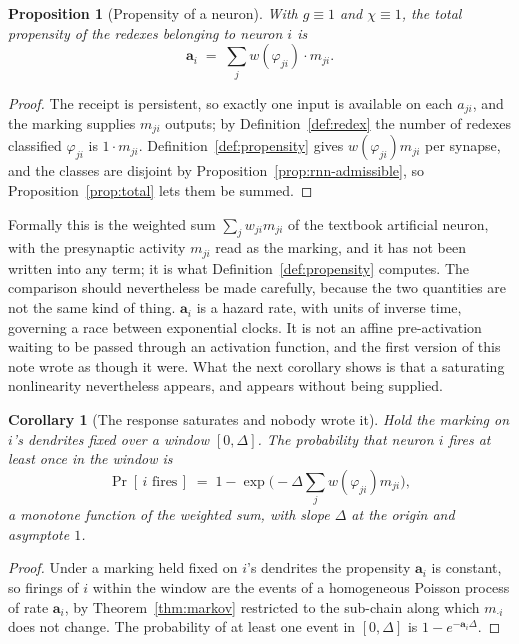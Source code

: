 \documentclass[11pt,a4paper]{article}
\theoremstyle{plain}
\newtheorem{proposition}[theorem]{Proposition}
\newtheorem{corollary}[theorem]{Corollary}
\theoremstyle{definition}
\theoremstyle{remark}
\newcommand{\prop}{\mathbf{a}}
\newcommand{\wmap}{w}
\newcommand{\gfac}{g}
\begin{document}
\begin{proposition}[Propensity of a neuron]
\label{prop:neuron-prop}
With $\gfac \equiv 1$ and $\chi \equiv 1$, the total propensity of the redexes belonging to neuron
$i$ is
\[
\prop_i \;=\; \sum_{j} \wmap(\varphi_{ji}) \cdot m_{ji} .
\]
\end{proposition}

\begin{proof}
The receipt is persistent, so exactly one input is available on each $a_{ji}$, and the marking
supplies $m_{ji}$ outputs; by Definition~\ref{def:redex} the number of redexes classified
$\varphi_{ji}$ is $1 \cdot m_{ji}$. Definition~\ref{def:propensity} gives $\wmap(\varphi_{ji})m_{ji}$
per synapse, and the classes are disjoint by Proposition~\ref{prop:rnn-admissible}, so
Proposition~\ref{prop:total} lets them be summed.
\end{proof}

Formally this is the weighted sum $\sum_j w_{ji} m_{ji}$ of the textbook artificial neuron, with the
presynaptic activity $m_{ji}$ read as the marking, and it has not been written into any term; it is
what Definition~\ref{def:propensity} computes. The comparison should nevertheless be made carefully,
because the two quantities are not the same kind of thing. $\prop_i$ is a hazard rate, with units of
inverse time, governing a race between exponential clocks. It is not an affine pre-activation waiting
to be passed through an activation function, and the first version of this note wrote as though it
were. What the next corollary shows is that a saturating nonlinearity nevertheless appears, and
appears without being supplied.

\begin{corollary}[The response saturates and nobody wrote it]
\label{cor:sigmoid}
Hold the marking on $i$'s dendrites fixed over a window $[0,\Delta]$. The probability that neuron $i$
fires at least once in the window is
\[
\Pr[\,\text{$i$ fires}\,] \;=\; 1 - \exp\!\big(-\Delta \textstyle\sum_j \wmap(\varphi_{ji}) m_{ji}\big),
\]
a monotone function of the weighted sum, with slope $\Delta$ at the origin and asymptote $1$.
\end{corollary}

\begin{proof}
Under a marking held fixed on $i$'s dendrites the propensity $\prop_i$ is constant, so firings of $i$
within the window are the events of a homogeneous Poisson process of rate $\prop_i$, by
Theorem~\ref{thm:markov} restricted to the sub-chain along which $m_{\cdot i}$ does not change. The
probability of at least one event in $[0,\Delta]$ is $1 - e^{-\prop_i \Delta}$.
\end{proof}
\end{document}
